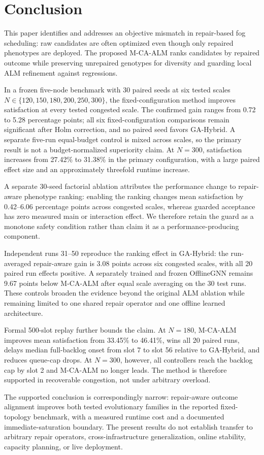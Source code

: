 \section{Conclusion}

This paper identifies and addresses an objective mismatch in repair-based fog scheduling: raw candidates are often optimized even though only repaired phenotypes are deployed. The proposed M-CA-ALM ranks candidates by repaired outcome while preserving unrepaired genotypes for diversity and guarding local ALM refinement against regressions.

In a frozen five-node benchmark with 30 paired seeds at six tested scales
$N\in\{120,150,180,200,250,300\}$, the fixed-configuration method improves
satisfaction at every tested congested scale. The confirmed gain ranges from
0.72 to 5.28 percentage points; all six fixed-configuration comparisons remain
significant after Holm correction, and no paired seed favors GA-Hybrid. A
separate five-run equal-budget control is mixed across scales, so the primary
result is not a budget-normalized superiority claim. At $N=300$, satisfaction
increases from 27.42\% to 31.38\% in the primary configuration, with a large
paired effect size and an approximately threefold runtime increase.

A separate 30-seed factorial ablation attributes the performance change to repair-aware phenotype ranking: enabling the ranking changes mean satisfaction by 0.42--6.06 percentage points across congested scales, whereas guarded acceptance has zero measured main or interaction effect. We therefore retain the guard as a monotone safety condition rather than claim it as a performance-producing component.

Independent runs 31--50 reproduce the ranking effect in GA-Hybrid: the run-averaged repair-aware gain is 3.08 points across six congested scales, with all 20 paired run effects positive. A separately trained and frozen OfflineGNN remains 9.67 points below M-CA-ALM after equal scale averaging on the 30 test runs. These controls broaden the evidence beyond the original ALM ablation while remaining limited to one shared repair operator and one offline learned architecture.

Formal 500-slot replay further bounds the claim. At $N=180$, M-CA-ALM improves mean satisfaction from 33.45\% to 46.41\%, wins all 20 paired runs, delays median full-backlog onset from slot 7 to slot 56 relative to GA-Hybrid, and reduces queue-cap drops. At $N=300$, however, all controllers reach the backlog cap by slot 2 and M-CA-ALM no longer leads. The method is therefore supported in recoverable congestion, not under arbitrary overload.

The supported conclusion is correspondingly narrow: repair-aware outcome alignment improves both tested evolutionary families in the reported fixed-topology benchmark, with a measured runtime cost and a documented immediate-saturation boundary. The present results do not establish transfer to arbitrary repair operators, cross-infrastructure generalization, online stability, capacity planning, or live deployment.
